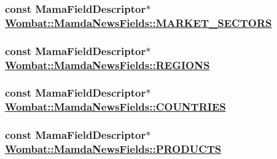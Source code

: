 \hypertarget{classWombat_1_1MamdaNewsFields_e86fe82cd9f617ee0cae392697aa7fdf}{
\subsubsection[MARKET\_\-SECTORS]{\setlength{\rightskip}{0pt plus 5cm}const Mama\-Field\-Descriptor$\ast$ \hyperlink{classWombat_1_1MamdaNewsFields_e86fe82cd9f617ee0cae392697aa7fdf}{Wombat::Mamda\-News\-Fields::MARKET\_\-SECTORS}}}
\label{classWombat_1_1MamdaNewsFields_e86fe82cd9f617ee0cae392697aa7fdf}


\hypertarget{classWombat_1_1MamdaNewsFields_5f83e6f931980d98d0758cb265eb33ff}{
\subsubsection[REGIONS]{\setlength{\rightskip}{0pt plus 5cm}const Mama\-Field\-Descriptor$\ast$ \hyperlink{classWombat_1_1MamdaNewsFields_5f83e6f931980d98d0758cb265eb33ff}{Wombat::Mamda\-News\-Fields::REGIONS}}}
\label{classWombat_1_1MamdaNewsFields_5f83e6f931980d98d0758cb265eb33ff}


\hypertarget{classWombat_1_1MamdaNewsFields_f8824103cdea9bf6ae34673a62955275}{
\subsubsection[COUNTRIES]{\setlength{\rightskip}{0pt plus 5cm}const Mama\-Field\-Descriptor$\ast$ \hyperlink{classWombat_1_1MamdaNewsFields_f8824103cdea9bf6ae34673a62955275}{Wombat::Mamda\-News\-Fields::COUNTRIES}}}
\label{classWombat_1_1MamdaNewsFields_f8824103cdea9bf6ae34673a62955275}


\hypertarget{classWombat_1_1MamdaNewsFields_2c2cb7d80e836bbde40631da69c58887}{
\subsubsection[PRODUCTS]{\setlength{\rightskip}{0pt plus 5cm}const Mama\-Field\-Descriptor$\ast$ \hyperlink{classWombat_1_1MamdaNewsFields_2c2cb7d80e836bbde40631da69c58887}{Wombat::Mamda\-News\-Fields::PRODUCTS}}}
\label{classWombat_1_1MamdaNewsFields_2c2cb7d80e836bbde40631da69c58887}


